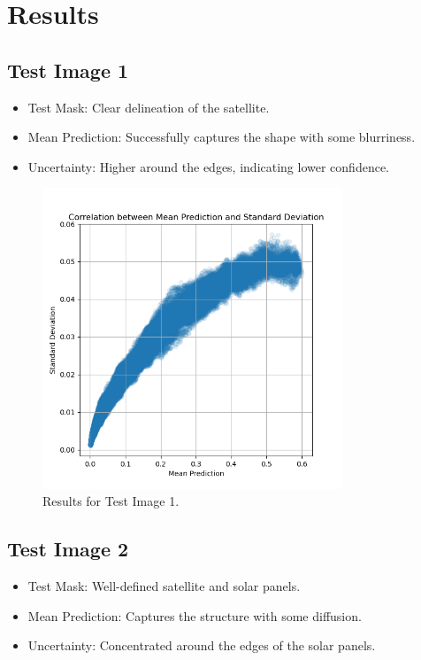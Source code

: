 \documentclass{article}
\begin{document}
\section{Results}
\subsection{Test Image 1}
\begin{itemize}
    \item Test Mask: Clear delineation of the satellite.
    \item Mean Prediction: Successfully captures the shape with some blurriness.
    \item Uncertainty: Higher around the edges, indicating lower confidence.
\end{itemize}

\begin{figure}[h]
    \centering
    \includegraphics[width=0.8\textwidth]{../images/MC_dropout/all_test_image_correlation_between_mean_prediction_and_std.png}
    \caption{Results for Test Image 1.}
    \label{fig:result_1}
\end{figure}

\subsection{Test Image 2}
\begin{itemize}
    \item Test Mask: Well-defined satellite and solar panels.
    \item Mean Prediction: Captures the structure with some diffusion.
    \item Uncertainty: Concentrated around the edges of the solar panels.
\end{itemize}
\end{document}
